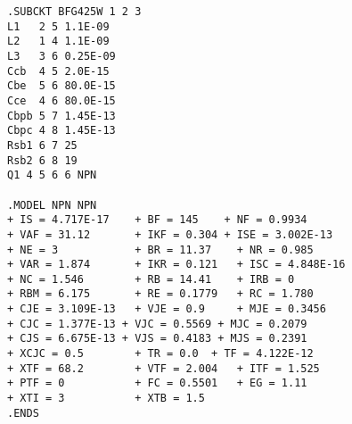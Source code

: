 \begin{verbatim}
.SUBCKT BFG425W 1 2 3 
L1   2 5 1.1E-09
L2   1 4 1.1E-09
L3   3 6 0.25E-09
Ccb  4 5 2.0E-15
Cbe  5 6 80.0E-15
Cce  4 6 80.0E-15
Cbpb 5 7 1.45E-13 
Cbpc 4 8 1.45E-13 
Rsb1 6 7 25 
Rsb2 6 8 19 
Q1 4 5 6 6 NPN 

.MODEL NPN NPN 
+ IS = 4.717E-17 	+ BF = 145    + NF = 0.9934 
+ VAF = 31.12 		+ IKF = 0.304 + ISE = 3.002E-13 
+ NE = 3 			+ BR = 11.37 	+ NR = 0.985 
+ VAR = 1.874 		+ IKR = 0.121 	+ ISC = 4.848E-16 
+ NC = 1.546 		+ RB = 14.41	+ IRB = 0 
+ RBM = 6.175 		+ RE = 0.1779 	+ RC = 1.780
+ CJE = 3.109E-13 	+ VJE = 0.9 	+ MJE = 0.3456 
+ CJC = 1.377E-13 + VJC = 0.5569 + MJC = 0.2079 
+ CJS = 6.675E-13 + VJS = 0.4183 + MJS = 0.2391 
+ XCJC = 0.5 		+ TR = 0.0 	+ TF = 4.122E-12 
+ XTF = 68.2 		+ VTF = 2.004 	+ ITF = 1.525 
+ PTF = 0 			+ FC = 0.5501 	+ EG = 1.11 
+ XTI = 3 			+ XTB = 1.5 
.ENDS

\end{verbatim}
